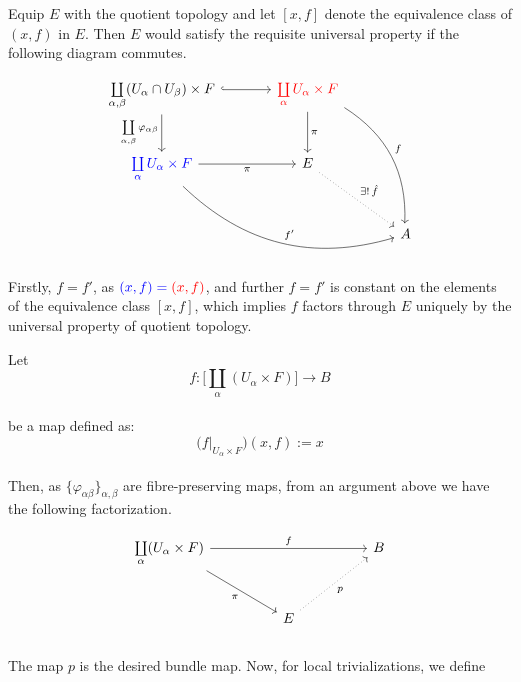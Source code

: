 \documentclass[11pt,a4paper]{article}
\begin{document}

Equip $E$ with the quotient topology and let $[x, f]$ denote the equivalence class of $(x, f)$ in $E$. Then $E$ would satisfy the requisite universal property if the following diagram commutes.

$$\begin{tikzcd}[column sep = large, row sep = large]
        \coprod\limits_{\alpha, \beta}(U_{\alpha}\cap U_{\beta})\cross F \arrow[hookrightarrow]{r} \arrow[d, "\coprod\limits_{\alpha, \beta} \varphi_{\alpha\beta}"']
        & \color{red}{\coprod\limits_{\alpha}U_{\alpha} \cross F} \arrow[d, "\pi"] \arrow[bend left]{ddr}{f}\\
        \color{blue}{\coprod\limits_{\alpha}U_{\alpha} \cross F} \arrow[bend right]{drr}{f'} \arrow[r, "\pi"'] & E \arrow[dotted]{dr}{\exists ! \hspace{0.5mm}\hat{f}}\\ & & A
    \end{tikzcd}$$


Firstly, $f = f'$, as $\color{blue}{(x, f)} = \color{red}{(x, f)}$, and further $f = f'$ is constant on the elements of the equivalence class $[x, f]$, which implies $f$ factors through $E$ uniquely by the universal property of quotient topology.


Let $$f : \bigg[\coprod_{\alpha}(U_{\alpha}\times F)\bigg] \longrightarrow B$$\\
be a map defined as:
$$\big(f\big|_{U_{\alpha}\times F}\big)(x, f) := x$$\\
Then, as $\{\varphi_{\alpha\beta}\}_{\alpha, \beta}$ are fibre-preserving maps, from an argument above we have the following factorization.

$$\begin{tikzcd}[column sep=huge,row sep=large]
        \coprod\limits_{\alpha}(U_{\alpha}\cross F) \arrow[rd, "\pi"'] \arrow[rr, "f"]
        && B  \\
        & E \arrow[dotted, swap]{ur}{p}
    \end{tikzcd}$$\\

The map $p$ is the desired bundle map. Now, for local trivializations, we define
\end{document}
